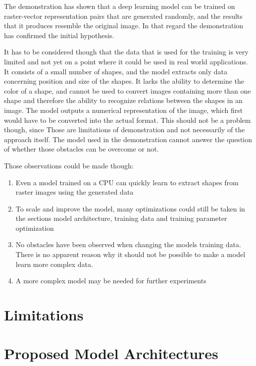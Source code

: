 \documentclass[12pt, a4paper, titlepage]{report}
\begin{document}
The demonstration has shown that a deep learning model can be trained on raster-vector representation pairs that are generated randomly, and the results that it produces resemble the original image. In that regard the demonstration has confirmed the initial hypothesis.

It has to be considered though that the data that is used for the training is very limited and not yet on a point where it could be used in real world applications. It consists of a small number of shapes, and the model extracts only data concerning position and size of the shapes. It lacks the ability to determine the color of a shape, and cannot be used to convert images containing more than one shape and therefore the ability to recognize relations between the shapes in an image. The model outputs a numerical representation of the image, which first would have to be converted into the actual format. This should not be a problem though, since 
Those are limitations of demonstration and not necessarily of the approach itself. The model used in the demonstration cannot answer the question of whether those obstacles can be overcome or not.

Those observations could be made though:

\begin{enumerate}[label=\Roman*]
   \item Even a model trained on a CPU can quickly learn to extract shapes from raster images using the generated data
   \item To scale and improve the model, many optimizations could still be taken in the sections model architecture, training data and training parameter optimization
   \item No obstacles have been observed when changing the models training data. There is no apparent reason why it should not be possible to make a model learn more complex data.
   \item A more complex model may be needed for further experiments
\end{enumerate}


\section{Limitations}

\section{Proposed Model Architectures}
\end{document}
